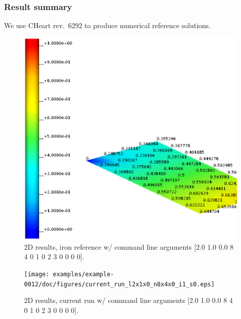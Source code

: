 \subsubsection{Result summary}
%
We use CHeart rev.\ 6292 to produce numerical reference solutions.
%


%
\begin{figure}[h!]
    \centering 
    \includegraphics[width=0.9\columnwidth]{examples/example-0012/doc/figures/iron_reference_2D.eps} 
    \caption{2D results, iron reference w/ command line arguments [2.0 1.0 0.0 8 4 0 1 0 2 3 0 0 0 0].}
    \label{example-0012-iron-2D-reference-fig}
\end{figure}
%
\begin{figure}[h!]
    \centering 
    \texttt{[image: examples/example-0012/doc/figures/current\_run\_l2x1x0\_n8x4x0\_i1\_s0.eps]} 
    \caption{2D results, current run w/ command line arguments [2.0 1.0 0.0 8 4 0 1 0 2 3 0 0 0 0].}
    \label{example-0012-current-run-2D-fig}
\end{figure}
%
